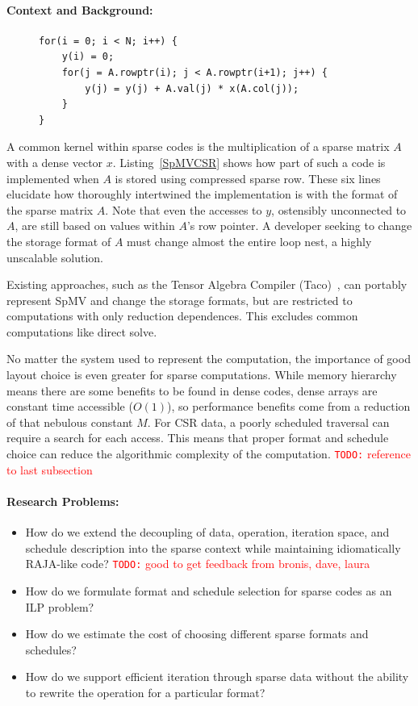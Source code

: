 \documentclass{article}
\newcommand{\todo}[1]{{\textcolor{red}{{\tt{TODO:}}\,\,#1 }}}
\begin{document}
\paragraph{Context and Background:}
\begin{figure}
\begin{lstlisting}[caption={CSR-stored sparse matrix vector multiplication},label={SpMVCSR}]
for(i = 0; i < N; i++) {
    y(i) = 0;
    for(j = A.rowptr(i); j < A.rowptr(i+1); j++) {
        y(j) = y(j) + A.val(j) * x(A.col(j));
    }
}
\end{lstlisting}
\end{figure}

A common kernel within sparse codes is the multiplication of a sparse matrix $A$ with a dense vector $x$.
Listing~\ref{SpMVCSR} shows how part of such a code is implemented when $A$ is stored using compressed sparse row.
These six lines elucidate how thoroughly intertwined the implementation is with the format of the sparse matrix $A$.
Note that even the accesses to $y$, ostensibly unconnected to $A$, are still based on values within $A$'s row pointer.
A developer seeking to change the storage format of $A$ must change almost the entire loop nest, a highly unscalable solution.

Existing approaches, such as the Tensor Algebra Compiler (Taco)~\cite{kjolstad2017tensor}, can portably represent SpMV and change the storage formats, but are restricted to computations with only reduction dependences.
This excludes common computations like direct solve.

No matter the system used to represent the computation, the importance of good layout choice is even greater for sparse computations.
While memory hierarchy means there are some benefits to be found in dense codes, dense arrays are constant time accessible ($O(1)$), so performance benefits come from a reduction of that nebulous constant $M$.
For CSR data, a poorly scheduled traversal can require a search for each access.
This means that proper format and schedule choice can reduce the algorithmic complexity of the computation.
\todo{reference to last subsection}


\paragraph{Research Problems:}
\begin{itemize}
    \item How do we extend the decoupling of data, operation, iteration space, and schedule description into the sparse context while maintaining idiomatically RAJA-like code? \todo{good to get feedback from bronis, dave, laura}
    \item How do we formulate format and schedule selection for sparse codes as an ILP problem?
    \item How do we estimate the cost of choosing different sparse formats and schedules?
    \item How do we support efficient iteration through sparse data without the ability to rewrite the operation for a particular format? 
\end{itemize}
\end{document}
